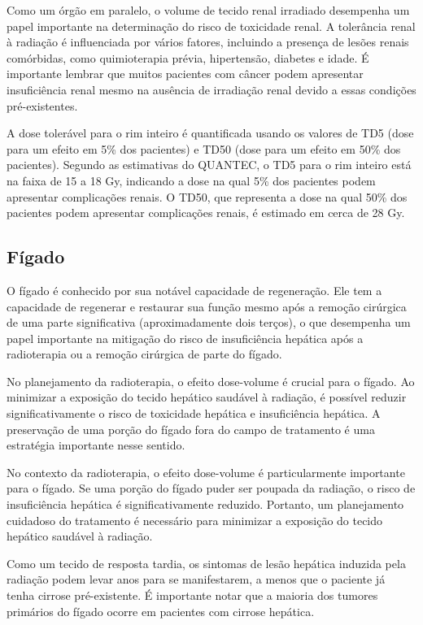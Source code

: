 \documentclass[11pt,a4paper]{article}
\begin{document}
	Como um órgão em paralelo, o volume de tecido renal irradiado desempenha um papel importante na determinação do risco de toxicidade renal. A tolerância renal à radiação é influenciada por vários fatores, incluindo a presença de lesões renais comórbidas, como quimioterapia prévia, hipertensão, diabetes e idade. É importante lembrar que muitos pacientes com câncer podem apresentar insuficiência renal mesmo na ausência de irradiação renal devido a essas condições pré-existentes.

	A dose tolerável para o rim inteiro é quantificada usando os valores de TD5 (dose para um efeito em 5\% dos pacientes) e TD50 (dose para um efeito em 50\% dos pacientes). Segundo as estimativas do QUANTEC, o TD5 para o rim inteiro está na faixa de 15 a 18 Gy, indicando a dose na qual 5\% dos pacientes podem apresentar complicações renais. O TD50, que representa a dose na qual 50\% dos pacientes podem apresentar complicações renais, é estimado em cerca de 28 Gy.

\subsection*{Fígado}

	O fígado é conhecido por sua notável capacidade de regeneração. Ele tem a capacidade de regenerar e restaurar sua função mesmo após a remoção cirúrgica de uma parte significativa (aproximadamente dois terços), o que desempenha um papel importante na mitigação do risco de insuficiência hepática após a radioterapia ou a remoção cirúrgica de parte do fígado.

	No planejamento da radioterapia, o efeito dose-volume é crucial para o fígado. Ao minimizar a exposição do tecido hepático saudável à radiação, é possível reduzir significativamente o risco de toxicidade hepática e insuficiência hepática. A preservação de uma porção do fígado fora do campo de tratamento é uma estratégia importante nesse sentido.

	No contexto da radioterapia, o efeito dose-volume é particularmente importante para o fígado. Se uma porção do fígado puder ser poupada da radiação, o risco de insuficiência hepática é significativamente reduzido. Portanto, um planejamento cuidadoso do tratamento é necessário para minimizar a exposição do tecido hepático saudável à radiação.

	Como um tecido de resposta tardia, os sintomas de lesão hepática induzida pela radiação podem levar anos para se manifestarem, a menos que o paciente já tenha cirrose pré-existente. É importante notar que a maioria dos tumores primários do fígado ocorre em pacientes com cirrose hepática.
\end{document}
